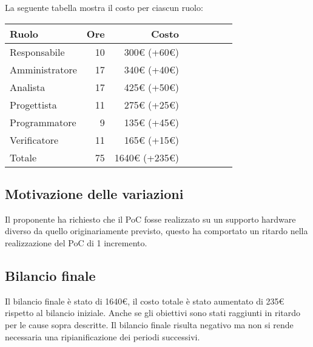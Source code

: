 La seguente tabella mostra il costo per ciascun ruolo:
\begin{table}[H]
    \begin{tabularx}{\linewidth}{X|rrrrrrr}
    \rowcolor{gray!30}Ruolo & Ore & Costo \\
    \hline
    Responsabile                            & 10    & 300€ (+60€)\\
    \rowcolor{gray!10}Amministratore        & 17    & 340€ (+40€)\\
    Analista                                & 17    & 425€ (+50€)\\
    \rowcolor{gray!10}Progettista           & 11    & 275€ (+25€) \\
    Programmatore                           & 9     & 135€ (+45€) \\
    \rowcolor{gray!10}Verificatore          & 11    & 165€ (+15€)\\
    \hline Totale                           & 75    & 1640€ (+235€) \\ 
    \end{tabularx}
\end{table}

\subsection{Motivazione delle variazioni}

Il proponente ha richiesto che il PoC fosse realizzato su un supporto hardware diverso da quello originariamente previsto, questo ha comportato un ritardo nella realizzazione del PoC di 1 incremento.

\subsection{Bilancio finale}

Il bilancio finale è stato di 1640€, il costo totale è stato aumentato di 235€ rispetto al bilancio iniziale. Anche se gli obiettivi sono stati raggiunti in ritardo per le cause sopra descritte. Il bilancio finale risulta negativo ma non si rende necessaria una ripianificazione dei periodi successivi.